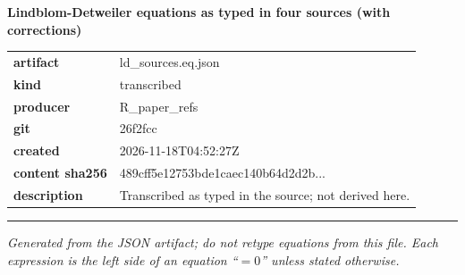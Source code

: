 \documentclass[10pt,a4paper]{article}
\begin{document}
{\Large\bfseries Lindblom-Detweiler equations as typed in four sources (with corrections)}\par
\smallskip
\begin{tabular}{@{}lp{}@{}}\textbf{artifact} & ld\_sources.eq.json\\\textbf{kind} & transcribed\\\textbf{producer} & R\_paper\_refs\\\textbf{git} & 26f2fcc\\\textbf{created} & 2026-11-18T04:52:27Z\\\textbf{content sha256} & 489cff5e12753bde1caec140b64d2d2b...\\\textbf{description} & Transcribed as typed in the source; not derived here.\\\end{tabular}
\par\medskip\hrule\medskip

\textit{Generated from the JSON artifact; do not retype equations from this file. Each expression is the left side of an equation ``$= 0$'' unless stated otherwise.}\par
\end{document}
